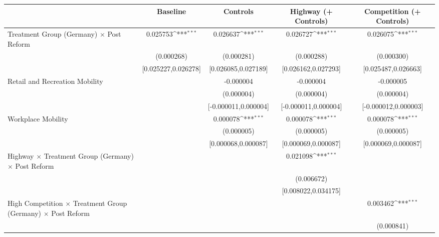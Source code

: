 {
\def\sym#1{\ifmmode^{#1}\else\(^{#1}\)\fi}
\begin{tabular}{l*{4}{c}}
\toprule
                    &\multicolumn{1}{c}{Baseline}&\multicolumn{1}{c}{Controls}&\multicolumn{1}{c}{Highway (+ Controls)}&\multicolumn{1}{c}{Competition (+ Controls)}\\
\midrule
Treatment Group (Germany) $\times$ Post Reform&    0.025753\sym{***}&    0.026637\sym{***}&    0.026727\sym{***}&    0.026075\sym{***}\\
                    &  (0.000268)         &  (0.000281)         &  (0.000288)         &  (0.000300)         \\
                    &[0.025227,0.026278]         &[0.026085,0.027189]         &[0.026162,0.027293]         &[0.025487,0.026663]         \\
Retail and Recreation Mobility&                     &   -0.000004         &   -0.000004         &   -0.000005         \\
                    &                     &  (0.000004)         &  (0.000004)         &  (0.000004)         \\
                    &                     &[-0.000011,0.000004]         &[-0.000011,0.000004]         &[-0.000012,0.000003]         \\
Workplace Mobility  &                     &    0.000078\sym{***}&    0.000078\sym{***}&    0.000078\sym{***}\\
                    &                     &  (0.000005)         &  (0.000005)         &  (0.000005)         \\
                    &                     &[0.000068,0.000087]         &[0.000069,0.000087]         &[0.000069,0.000087]         \\
Highway $\times$ Treatment Group (Germany) $\times$ Post Reform&                     &                     &    0.021098\sym{***}&                     \\
                    &                     &                     &  (0.006672)         &                     \\
                    &                     &                     &[0.008022,0.034175]         &                     \\
High Competition $\times$ Treatment Group (Germany) $\times$ Post Reform&                     &                     &                     &    0.003462\sym{***}\\
                    &                     &                     &                     &  (0.000841)         \\

\end{tabular}}

